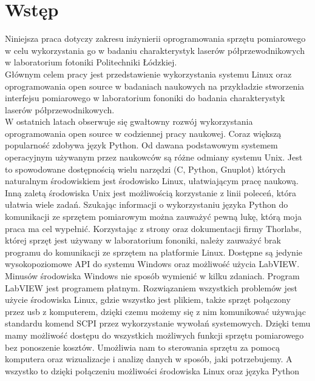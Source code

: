 \documentclass[a4paper, portrait,12pt]{mwrep}
\begin{document}
\tableofcontents    %
\newpage

\chapter{Wstęp} \label{rozdz.wstep}
Niniejsza praca dotyczy zakresu inżynierii oprogramowania sprzętu pomiarowego w celu wykorzystania go w badaniu charakterystyk laserów półprzewodnikowych w laboratorium fotoniki Politechniki Łódzkiej. \\

Głównym celem pracy jest przedstawienie wykorzystania systemu Linux oraz oprogramowania open source w badaniach naukowych na przykładzie stworzenia interfejsu
pomiarowego w laboratorium fononiki do badania charakterystyk laserów półprzewodnikowych. \\

W ostatnich latach obserwuje się gwałtowny rozwój wykorzystania oprogramowania
open source w codziennej pracy naukowej. Coraz większą popularność zdobywa język Python. Od dawana podstawowym systemem operacyjnym używanym przez naukowców są różne odmiany systemu Unix. Jest to spowodowane dostępnością wielu narzędzi (C, Python,
Gnuplot) których naturalnym środowiskiem jest środowisko Linux, ułatwiającym pracę naukową. Inną
zaletą środowiska Unix jest możliwością korzystanie z linii poleceń, która ułatwia wiele
zadań. Szukając informacji o wykorzystaniu języka Python do komunikacji ze sprzętem pomiarowym można zauważyć pewną lukę, którą moja praca ma cel wypełnić. Korzystając
z strony oraz dokumentacji firmy Thorlabs, której sprzęt jest używany w laboratorium
fononiki, należy zauważyć brak programu do komunikacji ze sprzętem na platformie Linux.
Dostępne są jedynie wysokopoziomowe API do systemu Windows oraz możliwość użycia
LabVIEW. Minusów środowiska Windows nie sposób wymienić w kilku zdaniach. Program
LabVIEW jest programem płatnym. Rozwiązaniem wszystkich problemów jest użycie środowiska Linux, gdzie wszystko jest plikiem, także sprzęt połączony przez usb z komputerem, dzięki czemu możemy się z nim komunikować używając standardu komend SCPI przez
wykorzystanie wywołań systemowych. Dzięki temu mamy możliwość dostępu do wszystkich możliwych funkcji sprzętu pomiarowego bez ponoszenie kosztów. Umożliwia nam to
sterowania sprzętu za pomocą komputera oraz wizualizacje i analizę danych w sposób, jaki
potrzebujemy. A wszystko to dzięki połączeniu możliwości środowiska Linux oraz języka Python \\
\end{document}
